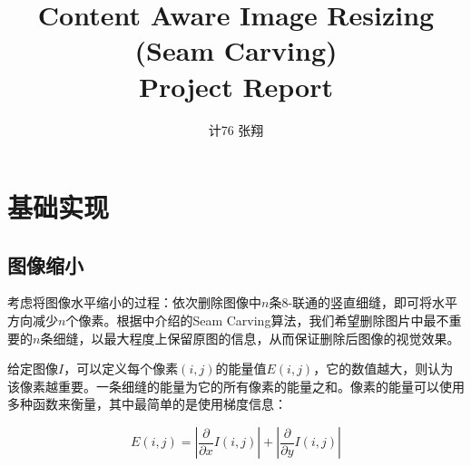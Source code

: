 \documentclass[twoside,a4paper,4pt]{article}
\title{\textbf{Content Aware Image Resizing (Seam Carving) \\ Project Report}}
\author{计76 \quad 张翔 \quad 2017011568}
\begin{document}
\maketitle

\section{基础实现}
\subsection{图像缩小}

考虑将图像水平缩小的过程：依次删除图像中$n$条8-联通的竖直细缝，即可将水平方向减少$n$个像素。根据\cite{avidan2007seam}中介绍的Seam Carving算法，我们希望删除图片中最不重要的$n$条细缝，以最大程度上保留原图的信息，从而保证删除后图像的视觉效果。\par
给定图像$I$，可以定义每个像素$(i,j)$的能量值$E(i,j)$，它的数值越大，则认为该像素越重要。一条细缝的能量为它的所有像素的能量之和。像素的能量可以使用多种函数来衡量，其中最简单的是使用梯度信息：

$$
E(i,j) = \left|\frac{\partial}{\partial x} I(i, j)\right| + \left|\frac{\partial}{\partial y} I(i, j)\right|
$$
\end{document}
